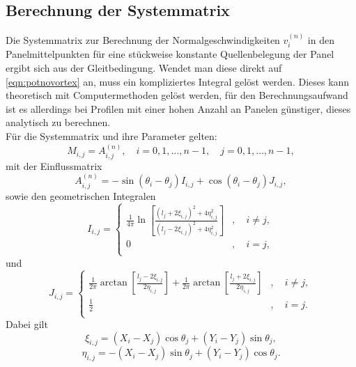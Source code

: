 \subsection{Berechnung der Systemmatrix}
\label{chap:systemmatrixtheory}
Die Systemmatrix zur Berechnung der Normalgeschwindigkeiten $v_i^{(n)}$ in den Panelmittelpunkten für eine stückweise konstante Quellenbelegung der Panel ergibt sich aus der Gleitbedingung. Wendet man diese direkt auf \eqref{eqn:potnovortex} an, muss ein kompliziertes Integral gelöst werden. Dieses kann theoretisch mit Computermethoden gelöst werden, für den Berechnungsaufwand ist es allerdings bei Profilen mit einer hohen Anzahl an Panelen günstiger, dieses analytisch zu berechnen. \\
Für die Systemmatrix und ihre Parameter gelten:
\begin{equation}
\label{eq:mnovortex}
M_{i,j} = A_{i,j}^{(n)},  \quad i = 0, 1, \ldots , n-1,  \quad j = 0,1,\ldots , n-1,
\end{equation}
mit der Einflussmatrix
\begin{equation}
\label{eq:An}
A_{i,j}^{(n)} = -\sin {(\theta _i - \theta _j)} I_{i,j} + \cos{(\theta _i - \theta _j)} J_{i,j},
\end{equation}
sowie den geometrischen Integralen
\begin{equation}
I_{i,j} = 
     \begin{cases}
       \frac{1}{4\pi } \ln \left[ \frac{(l_j + 2 \xi_{i,j})^2 + 4 \eta_{i,j}^2}{(l_j -2 \xi _{i,j})^2 + 4 \eta_{i,j}^2} \right] &,\quad i \neq j, \\
       0 &,\quad i = j, \\
     \end{cases}
\end{equation}
und
\begin{equation}
J_{i,j} = 
     \begin{cases}
       \frac{1}{2\pi } \arctan \left[ \frac{l_j - 2 \xi_{i,j}}{2 \eta_{i,j}} \right] + \frac{1}{2\pi } \arctan \left[ \frac{l_j + 2 \xi_{i,j}}{2 \eta_{i,j}} \right] &,\quad i \neq j, \\
       \frac{1}{2} &,\quad i = j. \\
     \end{cases}
\end{equation}
Dabei gilt
\begin{equation}
\label{eq:xi}
\xi_{i,j} =  (X_i - X_j) \cos \theta _j + (Y_i - Y_j) \sin \theta _j,
\end{equation}
\begin{equation}
\label{eq:eta}
\eta_{i,j} =  -(X_i - X_j) \sin \theta _j + (Y_i - Y_j) \cos \theta _j.
\end{equation}
